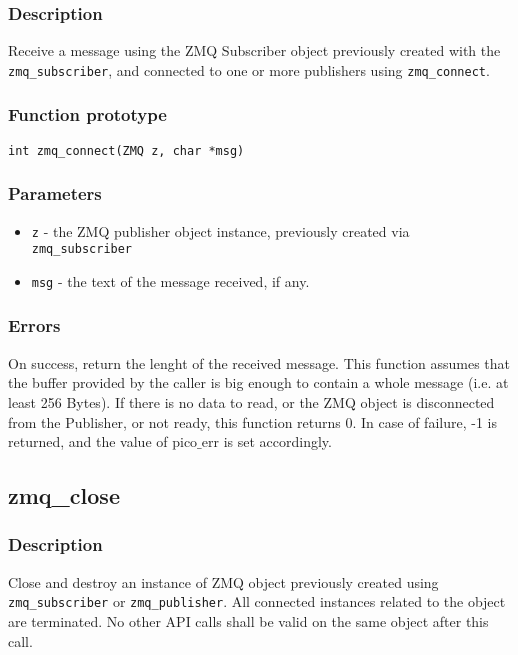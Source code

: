 \subsubsection*{Description}
Receive a message using the ZMQ Subscriber object previously created with the \texttt{zmq\_subscriber}, and connected to one or more publishers using \texttt{zmq\_connect}. 

\subsubsection*{Function prototype}
\begin{verbatim}
int zmq_connect(ZMQ z, char *msg)
\end{verbatim}

\subsubsection*{Parameters}
\begin{itemize}[noitemsep]
\item \texttt{z} - the ZMQ publisher object instance, previously created via \texttt{zmq\_subscriber} 
\item \texttt{msg} - the text of the message received, if any.
\end{itemize}

\subsubsection*{Errors}
On success, return the lenght of the received message. This function assumes that the buffer provided by the caller is big enough to contain a whole message (i.e. at least 256 Bytes).
If there is no data to read, or the ZMQ object is disconnected from the Publisher, or not ready, this function returns 0.
In case of failure, -1 is returned, and the value of pico$\_$err
is set accordingly.

\subsection{zmq\_close}
\subsubsection*{Description}
Close and destroy an instance of ZMQ object previously created using \texttt{zmq\_subscriber} or \texttt{zmq\_publisher}. All connected instances related to the object are terminated. No other API calls shall be valid on the same object after this call.

